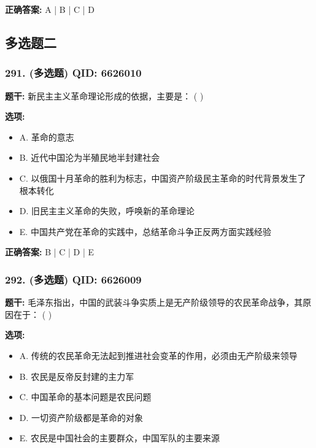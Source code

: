 \documentclass[12pt,UTF8]{ctexart}
\begin{document}
\textbf{正确答案:}
A | B | C | D

\vspace{0.3em}\hrulefill\vspace{0.7em}

\subsection*{多选题二}

\subsubsection*{291. (多选题) \small QID: 6626010}

\textbf{题干:}
新民主主义革命理论形成的依据，主要是： ( )

\textbf{选项:}
\begin{itemize}[leftmargin=*]

  \item A. 革命的意志

  \item B. 近代中国沦为半殖民地半封建社会

  \item C. 以俄国十月革命的胜利为标志，中国资产阶级民主革命的时代背景发生了根本转化

  \item D. 旧民主主义革命的失败，呼唤新的革命理论

  \item E. 中国共产党在革命的实践中，总结革命斗争正反两方面实践经验

\end{itemize}

\textbf{正确答案:}
B | C | D | E

\vspace{0.3em}\hrulefill\vspace{0.7em}

\subsubsection*{292. (多选题) \small QID: 6626009}

\textbf{题干:}
毛泽东指出，中国的武装斗争实质上是无产阶级领导的农民革命战争，其原因在于： ( )

\textbf{选项:}
\begin{itemize}[leftmargin=*]

  \item A. 传统的农民革命无法起到推进社会变革的作用，必须由无产阶级来领导

  \item B. 农民是反帝反封建的主力军

  \item C. 中国革命的基本问题是农民问题

  \item D. 一切资产阶级都是革命的对象

  \item E. 农民是中国社会的主要群众，中国军队的主要来源

\end{itemize}
\end{document}
